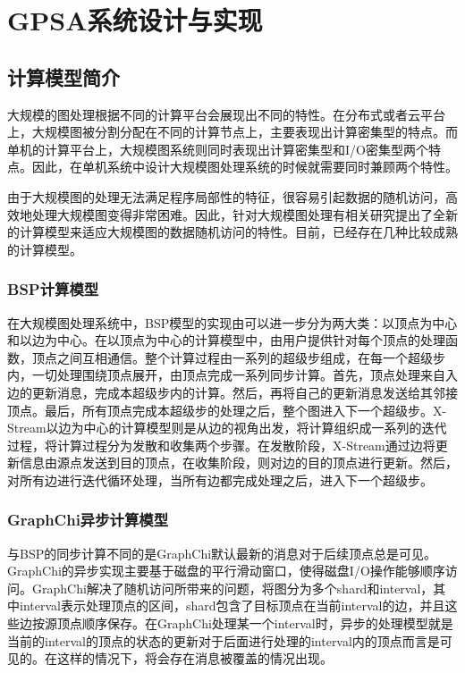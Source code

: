 
\chapter{GPSA系统设计与实现}

\section{计算模型简介}
大规模的图处理根据不同的计算平台会展现出不同的特性。在分布式或者云平台上，大规模图被分割分配在不同的计算节点上，主要表现出计算密集型的特点。而单机的计算平台上，大规模图系统则同时表现出计算密集型和I/O密集型两个特点。因此，在单机系统中设计大规模图处理系统的时候就需要同时兼顾两个特性。

由于大规模图的处理无法满足程序局部性的特征，很容易引起数据的随机访问，高效地处理大规模图变得非常困难。因此，针对大规模图处理有相关研究提出了全新的计算模型来适应大规模图的数据随机访问的特性。目前，已经存在几种比较成熟的计算模型。

\subsection{BSP计算模型}

在大规模图处理系统中，BSP模型的实现由可以进一步分为两大类：以顶点为中心和以边为中心。在以顶点为中心的计算模型中，由用户提供针对每个顶点的处理函数，顶点之间互相通信。整个计算过程由一系列的超级步组成，在每一个超级步内，一切处理围绕顶点展开，由顶点完成一系列同步计算。首先，顶点处理来自入边的更新消息，完成本超级步内的计算。然后，再将自己的更新消息发送给其邻接顶点。最后，所有顶点完成本超级步的处理之后，整个图进入下一个超级步。X-Stream以边为中心的计算模型则是从边的视角出发，将计算组织成一系列的迭代过程，将计算过程分为发散和收集两个步骤。在发散阶段，X-Stream通过边将更新信息由源点发送到目的顶点，在收集阶段，则对边的目的顶点进行更新。然后，对所有边进行迭代循环处理，当所有边都完成处理之后，进入下一个超级步。

\subsection{GraphChi异步计算模型}
与BSP的同步计算不同的是GraphChi默认最新的消息对于后续顶点总是可见。GraphChi的异步实现主要基于磁盘的平行滑动窗口，使得磁盘I/O操作能够顺序访问。GraphChi解决了随机访问所带来的问题，将图分为多个shard和interval，其中interval表示处理顶点的区间，shard包含了目标顶点在当前interval的边，并且这些边按源顶点顺序保存。在GraphChi处理某一个interval时，异步的处理模型就是当前的interval的顶点的状态的更新对于后面进行处理的interval内的顶点而言是可见的。在这样的情况下，将会存在消息被覆盖的情况出现。


